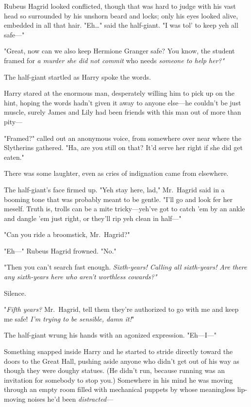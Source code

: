 Rubeus Hagrid looked conflicted, though that was hard to judge with his vast 
head so surrounded by his unshorn beard and locks; only his eyes looked alive, 
embedded in all that hair. "Eh{\ldots}" said the half-giant. "I was tol' to 
keep yeh all safe---"

"Great, now can we also keep Hermione Granger safe? You know, the student 
framed for \emph{a murder she did not commit} who needs \emph{someone to help 
her?"}

The half-giant startled as Harry spoke the words.

Harry stared at the enormous man, desperately willing him to pick up on the 
hint, hoping the words hadn't given it away to anyone else---he couldn't be 
just muscle, surely James and Lily had been friends with this man out of more 
than pity---

"Framed?" called out an anonymous voice, from somewhere over near where the 
Slytherins gathered. "Ha, are you still on that? It'd serve her right if she 
did get eaten."

There was some laughter, even as cries of indignation came from elsewhere.

The half-giant's face firmed up. "Yeh stay here, lad," Mr.~Hagrid said in a 
booming tone that was probably meant to be gentle. "I'll go and look fer her 
meself. Truth is, trolls can be a mite tricky---yeh've got to catch 'em by an 
ankle and dangle 'em just right, or they'll rip yeh clean in half---"

"Can you ride a broomstick, Mr.~Hagrid?"

"Eh---" Rubeus Hagrid frowned. "No."

"Then you can't search fast enough. \emph{Sixth-years! Calling all sixth-years! 
Are there any sixth-years here who aren't worthless cowards?"}

Silence.

"\emph{Fifth years?} Mr.~Hagrid, tell them they're authorized to go with me and 
keep me safe! \emph{I'm trying to be sensible, damn it!}"

The half-giant wrung his hands with an agonized expression. "Eh---I---"

Something snapped inside Harry and he started to stride directly toward the 
doors to the Great Hall, pushing aside anyone who didn't get out of his way as 
though they were doughy statues. (He didn't run, because running was an 
invitation for somebody to stop you.) Somewhere in his mind he was moving 
through an empty room filled with mechanical puppets by whose meaningless 
lip-moving noises he'd been \emph{distracted}---

